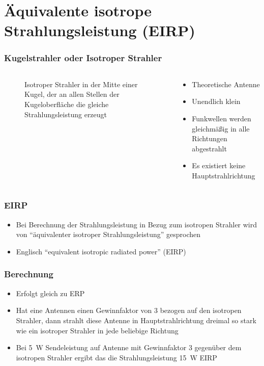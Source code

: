 
\section{Äquivalente isotrope Strahlungsleistung (EIRP)}
\label{section:aequivalente_isotrope_strahlungsleistung_eirp_1}
\begin{frame}%

\frametitle{Kugelstrahler oder Isotroper Strahler}
\begin{columns}
    \begin{column}{0.48\textwidth}
    
\begin{figure}
    \caption{\scriptsize Isotroper Strahler in der Mitte einer Kugel, der an allen Stellen der Kugeloberfläche die gleiche Strahlungsleistung erzeugt}
    \label{n_Kugelstrahler}
\end{figure}


    \end{column}
   \begin{column}{0.48\textwidth}
       \begin{itemize}
  \item Theoretische Antenne
  \item Unendlich klein
  \item Funkwellen werden gleichmäßig in alle Richtungen abgestrahlt
  \item Es existiert keine Hauptstrahlrichtung
  \end{itemize}

   \end{column}
\end{columns}

\end{frame}

\begin{frame}
\frametitle{EIRP}
\begin{itemize}
  \item Bei Berechnung der Strahlungsleistung in Bezug zum isotropen Strahler wird von \enquote{äquivalenter isotroper Strahlungsleistung} gesprochen
  \item Englisch \enquote{equivalent isotropic radiated power} (EIRP)
  \end{itemize}
\end{frame}

\begin{frame}
\frametitle{Berechnung}
\begin{itemize}
  \item Erfolgt gleich zu ERP
  \item Hat eine Antennen einen Gewinnfaktor von 3 bezogen auf den isotropen Strahler, dann strahlt diese Antenne in Hauptstrahlrichtung dreimal so stark wie ein isotroper Strahler in jede beliebige Richtung
  \item Bei 5~W Sendeleistung auf Antenne mit Gewinnfaktor 3 gegenüber dem isotropen Strahler ergibt das die Strahlungsleistung 15~W EIRP
  \end{itemize}
\end{frame}

